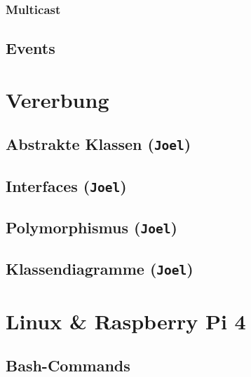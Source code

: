 \documentclass[
  9pt,
  a4paperpaper,
  DIV=11]{scrartcl}
\numberwithin{equation}{section}
\begin{document}
\begin{multicols}{2}
\begin{tcolorbox}
\begin{tcolorbox}
\begin{tcolorbox}
\begin{tcolorbox}
\begin{tcolorbox}
\begin{tcolorbox}
\hypertarget{multicast}{%
\subsubsection{Multicast}\label{multicast}}

\hypertarget{events}{%
\subsection{Events}\label{events}}

\hypertarget{vererbung}{%
\section{Vererbung}\label{vererbung}}

\hypertarget{abstrakte-klassen-joel}{%
\subsection{\texorpdfstring{Abstrakte Klassen
(\texttt{Joel})}{Abstrakte Klassen (Joel)}}\label{abstrakte-klassen-joel}}

\hypertarget{interfaces-joel}{%
\subsection{\texorpdfstring{Interfaces
(\texttt{Joel})}{Interfaces (Joel)}}\label{interfaces-joel}}

\hypertarget{polymorphismus-joel}{%
\subsection{\texorpdfstring{Polymorphismus
(\texttt{Joel})}{Polymorphismus (Joel)}}\label{polymorphismus-joel}}

\hypertarget{klassendiagramme-joel}{%
\subsection{\texorpdfstring{Klassendiagramme
(\texttt{Joel})}{Klassendiagramme (Joel)}}\label{klassendiagramme-joel}}

\hypertarget{linux-raspberry-pi-4}{%
\section{Linux \& Raspberry Pi 4}\label{linux-raspberry-pi-4}}

\hypertarget{bash-commands}{%
\subsection{Bash-Commands}\label{bash-commands}}


\end{tcolorbox}
\end{tcolorbox}
\end{tcolorbox}
\end{tcolorbox}
\end{tcolorbox}
\end{tcolorbox}
\end{multicols}
\end{document}
